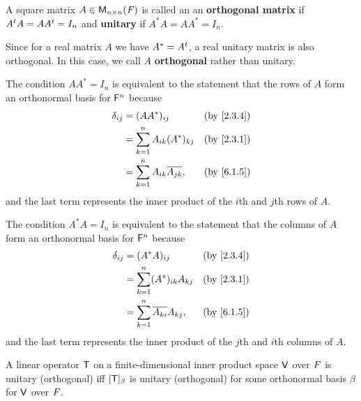 \begin{defn}\label{6.5.9}
	A square matrix \(A \in \ms[n][n][\F]\) is called an an \textbf{orthogonal matrix} if \({A}^{t} A = A {A}^{t} = I_n\) and \textbf{unitary} if \(A^* A = A A^* = I_n\).

	Since for a real matrix \(A\) we have \(A^* = {A}^{t}\), a real unitary matrix is also orthogonal.
	In this case, we call \(A\) \textbf{orthogonal} rather than unitary.

	The condition \(A A^* = I_n\) is equivalent to the statement that the rows of \(A\) form an orthonormal basis for \(\mathsf{F}^n\) because
	\begin{align*}
		\delta_{i j} & = (A A^*)_{i j}                          &  & \by{2.3.4} \\
		             & = \sum_{k = 1}^n A_{i k} (A^*)_{k j}     &  & \by{2.3.1} \\
		             & = \sum_{k = 1}^n A_{i k} \conj{A_{j k}}, &  & \by{6.1.5}
	\end{align*}
	and the last term represents the inner product of the \(i\)th and \(j\)th rows of \(A\).

	The condition \(A^* A = I_n\) is equivalent to the statement that the columns of \(A\) form an orthonormal basis for \(\mathsf{F}^n\) because
	\begin{align*}
		\delta_{i j} & = (A^* A)_{i j}                          &  & \by{2.3.4} \\
		             & = \sum_{k = 1}^n (A^*)_{i k} A_{k j}     &  & \by{2.3.1} \\
		             & = \sum_{k = 1}^n \conj{A_{k i}} A_{k j}, &  & \by{6.1.5}
	\end{align*}
	and the last term represents the inner product of the \(j\)th and \(i\)th columns of \(A\).
\end{defn}

\begin{cor}\label{6.5.10}
	A linear operator \(\mathsf{T}\) on a finite-dimensional inner product space \(\mathsf{V}\) over \(\mathit{F}\) is unitary (orthogonal) iff \([\mathsf{T}]_{\beta}\) is unitary (orthogonal) for some orthonormal basis \(\beta\) for \(\mathsf{V}\) over \(\mathit{F}\).
\end{cor}

